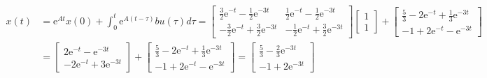 $$
\begin{aligned}
x(t) & =\mathrm{e}^{A t} x(0)+\int_0^t \mathrm{e}^{A(t-\tau)} b u(\tau) d \tau=\left[\begin{array}{cc}
\frac{3}{2} \mathrm{e}^{-t}-\frac{1}{2} \mathrm{e}^{-3 t} & \frac{1}{2} \mathrm{e}^{-t}-\frac{1}{2} \mathrm{e}^{-3 t} \\
-\frac{3}{2} \mathrm{e}^{-t}+\frac{3}{2} \mathrm{e}^{-3 t} & -\frac{1}{2} \mathrm{e}^{-t}+\frac{3}{2} \mathrm{e}^{-3 t}
\end{array}\right]\left[\begin{array}{l}
1 \\
1
\end{array}\right]+\left[\begin{array}{c}
\frac{5}{3}-2 \mathrm{e}^{-t}+\frac{1}{3} \mathrm{e}^{-3 t} \\
-1+2 \mathrm{e}^{-t}-\mathrm{e}^{-3 t}
\end{array}\right] \\
& =\left[\begin{array}{c}
2 \mathrm{e}^{-t}-\mathrm{e}^{-3 t} \\
-2 \mathrm{e}^{-t}+3 \mathrm{e}^{-3 t}
\end{array}\right]+\left[\begin{array}{l}
\frac{5}{3}-2 \mathrm{e}^{-t}+\frac{1}{3} \mathrm{e}^{-3 t} \\
-1+2 \mathrm{e}^{-t}-\mathrm{e}^{-3 t}
\end{array}\right]=\left[\begin{array}{c}
\frac{5}{3}-\frac{2}{3} \mathrm{e}^{-3 t} \\
-1+2 \mathrm{e}^{-3 t}
\end{array}\right]
\end{aligned}
$$

\newpage
